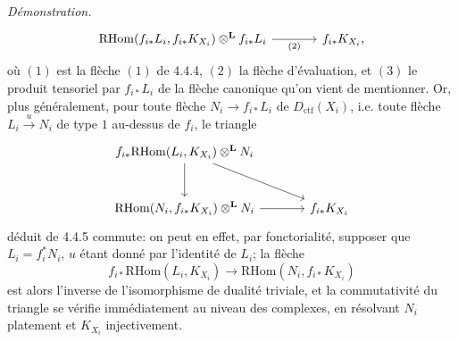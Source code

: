 \documentclass[11pt]{article}
\newenvironment{prooftext}[1][Proof]{\par\noindent\emph{#1.}\ }{\par\medskip}
\providecommand{\RHom}{\mathrm{RHom}}
\providecommand{\Dctf}{D_{\mathrm{ctf}}}
\providecommand{\Dctf}{D_{\mathrm{ctf}}}
\providecommand{\RHom}{\mathrm{RHom}}
\providecommand{\RHom}{\mathrm R\mathcal{H}om}
\begin{document}
\begin{prooftext}[Démonstration]
\begin{equation}
\begin{tikzcd}[column sep=large,row sep=large]
\RHom(f_{i*}L_i,f_{i*}K_{X_i})\otimes^{\mathbf L} f_{i*}L_i
 \arrow[r,"(2)"'] &
f_{i*}K_{X_i},
\end{tikzcd}
\end{equation}
où $(1)$ est la flèche $(1)$ de 4.4.4, $(2)$ la flèche d'évaluation, et $(3)$ le produit tensoriel par $f_{i*}L_i$ de la flèche canonique qu'on vient de mentionner. Or, plus généralement, pour toute flèche $N_i\longrightarrow f_{i*}L_i$ de $\Dctf(X_i)$, i.e. toute flèche $L_i\xrightarrow{u}N_i$ de type $1$ au-dessus de $f_i$, le triangle
\[
\begin{tikzcd}[column sep=large,row sep=large]
f_{i*}\RHom(L_i,K_{X_i})\otimes^{\mathbf L}N_i
 \arrow[dr] \arrow[d] & \\
\RHom(N_i,f_{i*}K_{X_i})\otimes^{\mathbf L}N_i \arrow[r] &
f_{i*}K_{X_i}
\end{tikzcd}
\]
déduit de 4.4.5 commute: on peut en effet, par fonctorialité, supposer que $L_i=f_i^*N_i$, $u$ étant donné par l'identité de $L_i$; la flèche
\[
f_{i*}\RHom(L_i,K_{X_i})\longrightarrow\RHom(N_i,f_{i*}K_{X_i})
\]
est alors l'inverse de l'isomorphisme de dualité triviale, et la commutativité du triangle se vérifie immédiatement au niveau des complexes, en résolvant $N_i$ platement et $K_{X_i}$ injectivement.


\end{prooftext}
\end{document}
